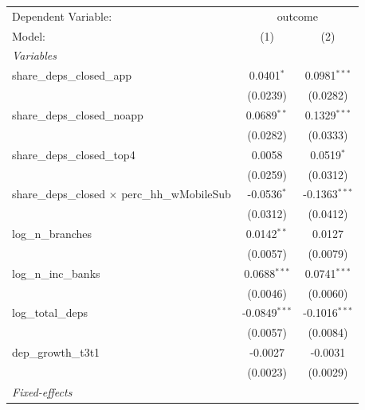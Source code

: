 \begingroup
\centering
\begin{tabular}{lcc}
   \tabularnewline \midrule \midrule
   Dependent Variable: & \multicolumn{2}{c}{outcome}\\
   Model:                                                 & (1)             & (2)\\  
   \midrule
   \emph{Variables}\\
   share\_deps\_closed\_app                               & 0.0401$^{*}$    & 0.0981$^{***}$\\   
                                                          & (0.0239)        & (0.0282)\\   
   share\_deps\_closed\_noapp                             & 0.0689$^{**}$   & 0.1329$^{***}$\\   
                                                          & (0.0282)        & (0.0333)\\   
   share\_deps\_closed\_top4                              & 0.0058          & 0.0519$^{*}$\\   
                                                          & (0.0259)        & (0.0312)\\   
   share\_deps\_closed $\times$ perc\_hh\_wMobileSub      & -0.0536$^{*}$   & -0.1363$^{***}$\\   
                                                          & (0.0312)        & (0.0412)\\   
   log\_n\_branches                                       & 0.0142$^{**}$   & 0.0127\\   
                                                          & (0.0057)        & (0.0079)\\   
   log\_n\_inc\_banks                                     & 0.0688$^{***}$  & 0.0741$^{***}$\\   
                                                          & (0.0046)        & (0.0060)\\   
   log\_total\_deps                                       & -0.0849$^{***}$ & -0.1016$^{***}$\\   
                                                          & (0.0057)        & (0.0084)\\   
   dep\_growth\_t3t1                                      & -0.0027         & -0.0031\\   
                                                          & (0.0023)        & (0.0029)\\   
   \midrule
   \emph{Fixed-effects}\\

\end{tabular}
